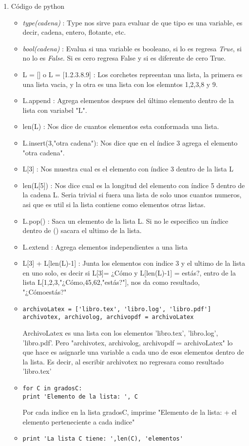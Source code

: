 \documentclass{book}
\begin{document}
\begin{enumerate}
	\item Código de python
	\begin{itemize}
		\item {\textit{type(cadena)}} : Type nos sirve para evaluar de que tipo es una variable, es decir, cadena, entero, flotante, etc.
		\item {\textit{bool(cadena)}} : Evalua si una variable es booleano, si lo es regresa {\textit{True}}, si no lo es {\textit{False}}. Si es cero regresa False y si es diferente de cero True.
		\item L = [] o L = [1.2.3.8.9] : Los corchetes repreentan una lista, la primera es una lista vacia, y la otra es una lista con los elemntos 1,2,3,8 y 9.
		\item L.append : Agrega elementos despues del último elemento dentro de la lista con variabel "L".
		\item len(L) : Nos dice de cuantos elementos esta conformada una lista.
		\item L.insert(3,"otra cadena"): Nos dice que  en el índice 3 agrega el elemento "otra cadena".
		\item L[3] : Nos muestra cual es el elemento con índice 3 dentro de la lista L
		\item len(L[5]) : Nos dice cual es la longitud del elemento con índice 5  dentro de la cadena L. Seria trivial si fuera una lista de solo unos cuantos numeros, asi que es util si la lista contiene como elementos otras listas.
		\item L.pop() : Saca un elemento de la lista L. Si no le especifico un índice dentro de () sacara el ultimo de la lista.
		\item L.extend : Agrega elementos independientes a una lista
		\item L[3] + L[len(L)-1] : Junta los elementos con indice 3 y el ultimo de la lista en uno solo, es decir si L[3]= ¿Cómo y L[len(L)-1] = estás?, entro de la lista L[1,2,3,"¿Cómo,45,62,"estás?"], nos da como resultado, "¿Cómoestás?"
		\item 
		\begin{lstlisting}
archivoLatex = ['libro.tex', 'libro.log', 'libro.pdf']
archivotex, archivolog, archivopdf = archivoLatex
		\end{lstlisting} ArchivoLatex es una lista con los elementos 'libro.tex', 'libro.log', 'libro.pdf'. Pero "archivotex, archivolog, archivopdf = archivoLatex" lo que hace es asignarle una variable a cada uno de esos elementos dentro de la lista. Es decir, al escribir archivotex no regresara como resultado 'libro.tex'
		\item 
		\begin{lstlisting}
for C in gradosC:
print 'Elemento de la lista: ', C
		\end{lstlisting} Por cada indice en la lista gradosC, imprime "Elemento de la lista: + el elemento perteneciente a cada indice" 
		\item 
		\begin{lstlisting}
print 'La lista C tiene: ',len(C), 'elementos'
		\end{lstlisting} ~
		

\end{itemize}
\end{enumerate}
\end{document}
